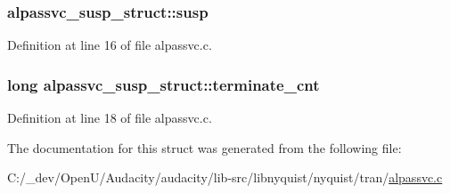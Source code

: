 \subsubsection[{\texorpdfstring{susp}{susp}}]{ alpassvc\+\_\+susp\+\_\+struct\+::susp}\hypertarget{structalpassvc__susp__struct_a609c1126e4edd7b9316992f96f955a3b}{}\label{structalpassvc__susp__struct_a609c1126e4edd7b9316992f96f955a3b}


Definition at line 16 of file alpassvc.\+c.

\subsubsection[{\texorpdfstring{terminate\+\_\+cnt}{terminate_cnt}}]{\setlength{\rightskip}{0pt plus 5cm}long alpassvc\+\_\+susp\+\_\+struct\+::terminate\+\_\+cnt}\hypertarget{structalpassvc__susp__struct_a9db5735c74407264e582943a8b75ad86}{}\label{structalpassvc__susp__struct_a9db5735c74407264e582943a8b75ad86}


Definition at line 18 of file alpassvc.\+c.



The documentation for this struct was generated from the following file\+:\begin{DoxyCompactItemize}
\item 
C\+:/\+\_\+dev/\+Open\+U/\+Audacity/audacity/lib-\/src/libnyquist/nyquist/tran/\hyperlink{alpassvc_8c}{alpassvc.\+c}\end{DoxyCompactItemize}
